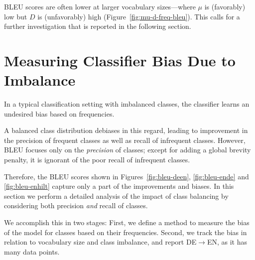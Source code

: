 \begin{figure*}[ht]
\caption{Visualization of sequence length ($\mu$) (lower is better), class imbalance (D) (lower is better), frequency of $95^{th}$ percentile class ($F_{95\%}$) (higher is better; plotted in logarithmic scale), and test set BLEU (higher is better) on all language pairs and training data sizes.
The vocabulary sizes that achieved highest BLEU are indicated with dashed vertical lines, and the vocabulary our heuristic selects is indicated by dotted vertical lines.}
\label{fig:mu-d-freq-bleu}
\end{figure*}

BLEU scores are often lower at larger vocabulary sizes---where $\mu$ is (favorably) low but $D$ is (unfavorably) high (Figure~\ref{fig:mu-d-freq-bleu}). This calls for a further investigation that is reported in the following section.

\section{Measuring Classifier Bias Due to Imbalance}
\label{sec:class-bias}

In a typical classification setting with imbalanced classes, the classifier learns an undesired bias based on frequencies. 

A balanced class distribution debiases in this regard, leading to improvement in the precision of frequent classes as well as recall of infrequent classes.
However, BLEU focuses only on the \textit{precision} of classes; except for adding a global brevity penalty, it is ignorant of the poor recall of infrequent classes. 

Therefore, the BLEU scores shown in Figures~\ref{fig:bleu-deen}, \ref{fig:bleu-ende} and \ref{fig:bleu-enhilt} capture only a part of the improvements and biases. 
In this section we perform a detailed analysis of the impact of class balancing by considering both precision \textit{and} recall of classes. 

We accomplish this in two stages:
First, we define a method to measure the bias of the model for classes based on their frequencies.
Second, we track the bias in relation to vocabulary size and class imbalance, and report DE$\rightarrow$EN, as it has many data points.

